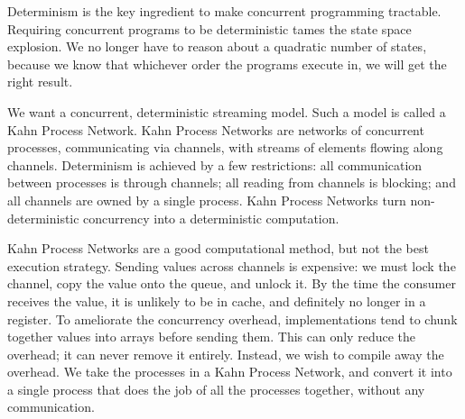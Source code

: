 Determinism is the key ingredient to make concurrent programming tractable.
Requiring concurrent programs to be deterministic tames the state space explosion.
We no longer have to reason about a quadratic number of states, because we know that whichever order the programs execute in, we will get the right result.

We want a concurrent, deterministic streaming model.
Such a model is called a Kahn Process Network.
Kahn Process Networks are networks of concurrent processes, communicating via channels, with streams of elements flowing along channels.
Determinism is achieved by a few restrictions: all communication between processes is through channels; all reading from channels is blocking; and all channels are owned by a single process.
Kahn Process Networks turn non-deterministic concurrency into a deterministic computation.

% 
% 

Kahn Process Networks are a good computational method, but not the best execution strategy.
Sending values across channels is expensive: we must lock the channel, copy the value onto the queue, and unlock it.
By the time the consumer receives the value, it is unlikely to be in cache, and definitely no longer in a register.
To ameliorate the concurrency overhead, implementations tend to chunk together values into arrays before sending them.
This can only reduce the overhead; it can never remove it entirely.
Instead, we wish to compile away the overhead.
We take the processes in a Kahn Process Network, and convert it into a single process that does the job of all the processes together, without any communication.

% 
% 
% 



